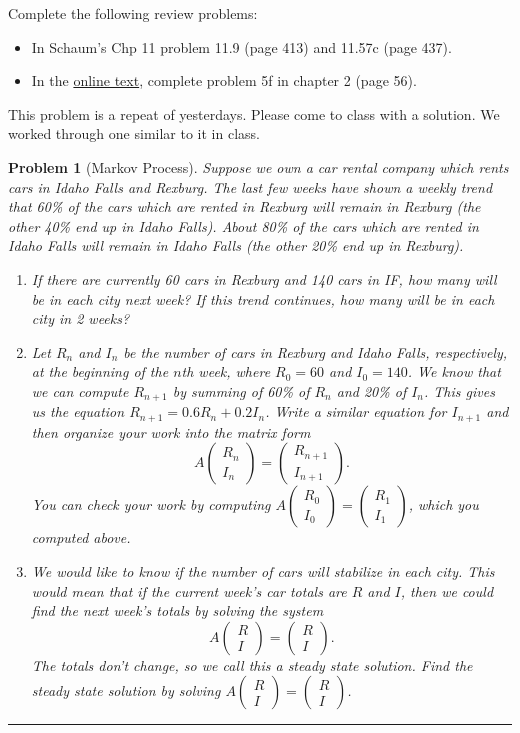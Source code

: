 \documentclass[letterpaper,oneside]{book}%
\newcommand{\onlinetext}{https://content.byui.edu/file/c2f91762-7a1e-4d0b-a1ae-8d5f5f548e17/1/341-Book.pdf}
\theoremstyle{plain}
\theoremstyle{box}
\theoremstyle{problem}
\newtheorem{problemnum}{Problem}[chapter]
\newtheorem*{hwenum*}{Home Work Practice}
\newenvironment{problem}[1][]{\begin{problemnum}[#1]}{\end{problemnum}\nopagebreak\hrule\bigskip}
\newenvironment{hw*}[1][]{\begin{hwenum*}[#1]}{\end{hwenum*}\nopagebreak\hrule\bigskip}
\newcommand{\pvec}[1]{\begin{pmatrix} #1 \end{pmatrix}}
\begin{document}
\begin{hw*}
Complete the following review problems:
 \begin{itemize}
  \item In Schaum's Chp 11 problem 11.9 (page 413)  and 11.57c (page 437).
  \item In the \href{\onlinetext}{online text}, complete problem 5f in chapter 2 (page 56).
 \end{itemize}
\end{hw*}

This problem is a repeat of yesterdays. Please come to class with a solution.  We worked through one similar to it in class. 
\begin{problem}[Markov Process]
Suppose we own a car rental company which rents cars in Idaho Falls and Rexburg. 
The last few weeks have shown a weekly trend that 60\% of the cars which are rented in Rexburg will remain in Rexburg (the other 40\% end up in Idaho Falls). 
About 80\% of the cars which are rented in Idaho Falls will remain in Idaho Falls (the other 20\% end up in Rexburg). 
\begin{enumerate}
 \item If there are currently 60 cars in Rexburg and 140 cars in IF, how many will be in each city next week? If this trend continues, how many will be in each city in 2 weeks?
 \item Let $R_n$ and $I_n$ be the number of cars in Rexburg and Idaho Falls, respectively, at the beginning of the $n$th week, where $R_0=60$ and $I_0=140$. We know that we can compute $R_{n+1}$ by summing of 60\% of $R_n$ and 20\% of $I_n$. This gives us the equation $R_{n+1}=0.6 R_n+0.2I_n$. Write a similar equation for $I_{n+1}$ and then organize your work into the matrix form $$A\pvec{R_{n}\\I_{n}} = \pvec{R_{n+1}\\I_{n+1}}.$$  You can check your work by computing $A\pvec{R_0\\I_0} = \pvec{R_1\\I_1}$, which you computed above.
 \item We would like to know if the number of cars will stabilize in each city. This would mean that if the current week's car totals are $R$ and $I$, then we could find the next week's totals by solving the system $$A\pvec{R\\I} = \pvec{R\\I}.$$  The totals don't change, so we call this a steady state solution. Find the steady state solution by solving $A\pvec{R\\I} = \pvec{R\\I}$. %

\end{enumerate}
\end{problem}
\end{document}
